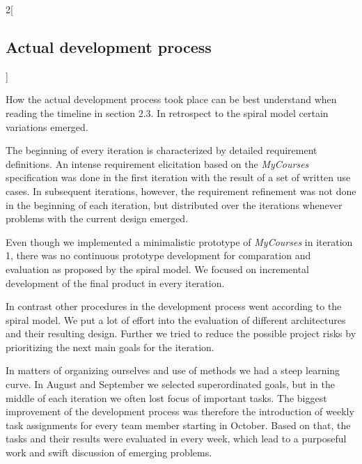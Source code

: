 \begin{multicols}{2}[\subsection{Actual development process}]
\label{sec:actual-development-process}

How the actual development process took place can be best understand when reading the timeline in section 2.3. In retrospect to the spiral model certain variations emerged. 

The beginning of every iteration is characterized by detailed requirement definitions. An intense requirement elicitation based on the \emph{MyCourses} specification was done in the first iteration with the result of a set of written use cases. In subsequent iterations, however, the requirement refinement was not done in the beginning of each iteration, but distributed over the iterations whenever problems with the current design emerged.

Even though we implemented a minimalistic prototype of \emph{MyCourses} in iteration 1, there was no continuous prototype development for comparation and evaluation as proposed by the spiral model. We focused on incremental development of the final product in every iteration.

In contrast other procedures in the development process went according to the spiral model. We put a lot of effort into the evaluation of different architectures and their resulting design. Further we tried to reduce the possible project risks by prioritizing the next main goals for the iteration.

In matters of organizing ourselves and use of methods we had a steep learning curve. In August and September we selected superordinated goals, but in the middle of each iteration we often lost focus of important tasks. The biggest improvement of the development process was therefore the introduction of weekly task assignments for every team member starting in October. Based on that, the tasks and their results were evaluated in every week, which lead to a purposeful work and swift discussion of emerging problems.



\end{multicols}
